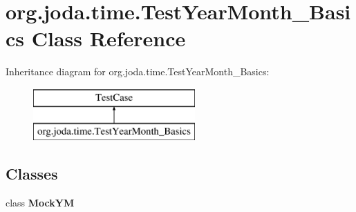 \hypertarget{classorg_1_1joda_1_1time_1_1_test_year_month___basics}{\section{org.\-joda.\-time.\-Test\-Year\-Month\-\_\-\-Basics Class Reference}
\label{classorg_1_1joda_1_1time_1_1_test_year_month___basics}
}
Inheritance diagram for org.\-joda.\-time.\-Test\-Year\-Month\-\_\-\-Basics\-:\begin{figure}[H]
\begin{center}
\leavevmode
\includegraphics[height=2.000000cm]{classorg_1_1joda_1_1time_1_1_test_year_month___basics}
\end{center}
\end{figure}
\subsection*{Classes}
\begin{DoxyCompactItemize}
\item 
class {\bfseries Mock\-Y\-M}
\end{DoxyCompactItemize}

